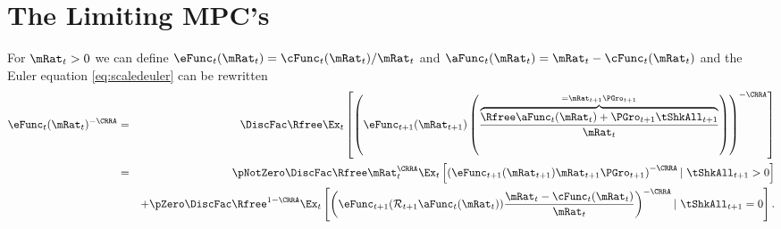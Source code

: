 \documentclass[../BufferStockTheory.tex]{subfiles}
\begin{document}
\hypertarget{The-Limiting-MPCs}{}
\section{The Limiting MPC's}
\label{sec:MPCLimits}
For $\mRat_{t}>0$ we can define $\eFunc_{t}(\mRat_{t})=\cFunc_{t}(\mRat_{t})/\mRat_{t}$
and $\aFunc_{t}(\mRat_{t})=\mRat_{t}-\cFunc_{t}(\mRat_{t})$
and the Euler equation \eqref{eq:scaledeuler} can be rewritten
\begin{eqnarray}
 \eFunc_{t}(\mRat_{t})^{-\CRRA} & = & \DiscFac \Rfree \Ex_{t}\left[\left(\eFunc_{t+1}({\mRat}_{t+1})\left(\frac{\overbrace{\Rfree \aFunc_{t}(\mRat_{t})+{\PGro}_{t+1}{\tShkAll}_{t+1}}^{=\mRat_{t+1}\PGro_{t+1}}}{\mRat_{t}}\right)\right)^{-\CRRA }\right] \label{eq:eFuncEuler}
\\ & = & \phantom{ + }\pNotZero \DiscFac \Rfree \mRat_{t}^{\CRRA} \Ex_{t}\left[ \left(\eFunc_{t+1}(\mRat_{t+1}) \mRat_{t+1}\PGro_{t+1}\right)^{-\CRRA} |~ \tShkAll_{t+1}>0 \right] \notag
\\ &  & + \pZero  \DiscFac \Rfree^{1-\CRRA} \Ex_{t}\left[\left(\eFunc_{t+1}(\mathcal{R}_{t+1}\aFunc_{t}(\mRat_{t}))\frac{\mRat_t-\cFunc_{t}(\mRat_{t})}{\mRat_{t}}\right)^{-\CRRA} |~ \tShkAll_{t+1} = 0 \right]  \label{eq:eRho}.
\end{eqnarray}
\end{document}
